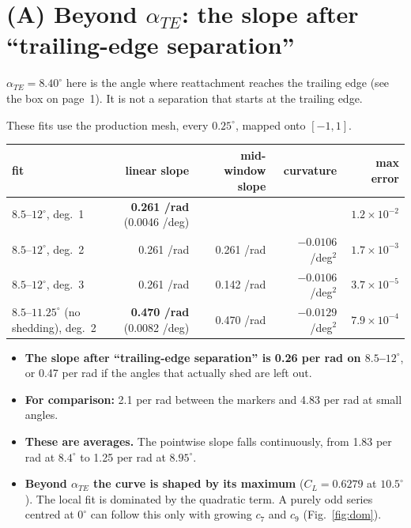 \documentclass[11pt,a4paper]{article}
\newcommand{\CL}{C_L}
\newcommand{\ate}{\alpha_{TE}}
\begin{document}
\section{(A) Beyond $\ate$: the slope after ``trailing-edge separation''}

\noindent\colorbox{Goldenrod!20}{\parbox{\dimexpr\linewidth-2\fboxsep}{\small
$\ate = 8.40^\circ$ here is the angle where reattachment reaches the trailing edge (see the box
on page~1). It is not a separation that starts at the trailing edge.}}

\smallskip
These fits use the production mesh, every $0.25^\circ$, mapped onto $[-1,1]$.

\begin{center}\footnotesize
\setlength{\tabcolsep}{4pt}
\begin{tabular}{lrrrr}
\toprule
fit & linear slope & mid-window slope & curvature & max error \\
\midrule
$8.5$--$12^\circ$, deg.~1 & \textbf{0.261 /rad} (0.0046 /deg) & & & $1.2\times10^{-2}$ \\
$8.5$--$12^\circ$, deg.~2 & 0.261 /rad & 0.261 /rad & $-0.0106$ /deg$^2$ & $1.7\times10^{-3}$ \\
$8.5$--$12^\circ$, deg.~3 & 0.261 /rad & 0.142 /rad & $-0.0106$ /deg$^2$ & $3.7\times10^{-5}$ \\
$8.5$--$11.25^\circ$ (no shedding), deg.~2 & \textbf{0.470 /rad} (0.0082 /deg) & 0.470 /rad & $-0.0129$ /deg$^2$ & $7.9\times10^{-4}$ \\
\bottomrule
\end{tabular}
\end{center}

\begin{itemize}[leftmargin=*]
\item \textbf{The slope after ``trailing-edge separation'' is 0.26 per rad on $8.5$--$12^\circ$}, or
  0.47 per rad if the angles that actually shed are left out.
\item \textbf{For comparison:} 2.1 per rad between the markers and 4.83 per rad at small angles.
\item \textbf{These are averages.} The pointwise slope falls continuously, from 1.83 per rad at
  $8.4^\circ$ to 1.25 per rad at $8.95^\circ$.
\item \textbf{Beyond $\ate$ the curve is shaped by its maximum} ($\CL = 0.6279$ at $10.5^\circ$).
  The local fit is dominated by the quadratic term. A purely odd series centred at $0^\circ$ can
  follow this only with growing $c_7$ and $c_9$ (Fig.~\ref{fig:dom}).
\end{itemize}
\end{document}
